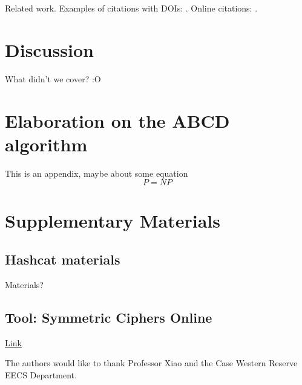 \documentclass[acmlarge]{acmart}
\begin{document}
Related work. Examples of citations with DOIs: \cite{2004:ITE:1009386.1010128, Kirschmer:2010:AEI:1958016.1958018}. Online citations: \cite{TUGInstmem, Thornburg01, CTANacmart}.

\section{Discussion}\label{sec:discussion}

What didn't we cover? :O

\appendix
\section{Elaboration on the ABCD algorithm}

This is an appendix, maybe about some equation
\begin{displaymath}
P=NP
\end{displaymath}

\section{Supplementary Materials}

\subsection{Hashcat materials}

Materials?

\subsection{Tool: Symmetric Ciphers Online }

\href{http://symmetric-ciphers.online-domain-tools.com/}{Link}

\begin{acks}

The authors would like to thank Professor Xiao and the Case Western Reserve EECS Department.

\end{acks}



\end{document}
